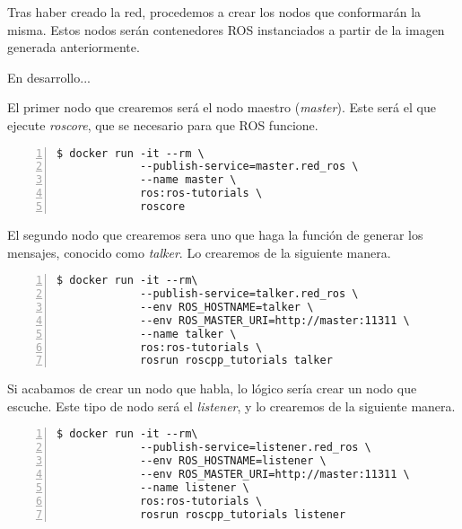 	Tras haber creado la red, procedemos a crear los nodos que conformarán la misma. Estos nodos serán contenedores ROS instanciados a partir de la imagen generada anteriormente.
	
	En desarrollo...
	
\iffalse
	


	El primer nodo que crearemos será el nodo maestro (\emph{master}). Este será el que ejecute \emph{roscore}, que se necesario para que ROS funcione.

	\begin{lstlisting}[style=consola,numbers=left]
$ docker run -it --rm \
             --publish-service=master.red_ros \
             --name master \
             ros:ros-tutorials \
             roscore
	\end{lstlisting}
	

	El segundo nodo que crearemos sera uno que haga la función de generar los mensajes, conocido como \emph{talker}. Lo crearemos de la siguiente manera.
		
	\begin{lstlisting}[style=consola,numbers=left]
$ docker run -it --rm\
             --publish-service=talker.red_ros \
             --env ROS_HOSTNAME=talker \
             --env ROS_MASTER_URI=http://master:11311 \
             --name talker \
             ros:ros-tutorials \
             rosrun roscpp_tutorials talker
	\end{lstlisting}
	

	Si acabamos de crear un nodo que habla, lo lógico sería crear un nodo que escuche. Este tipo de nodo será el \emph{listener}, y lo crearemos de la siguiente manera.

	\begin{lstlisting}[style=consola,numbers=left]
$ docker run -it --rm\
             --publish-service=listener.red_ros \
             --env ROS_HOSTNAME=listener \
             --env ROS_MASTER_URI=http://master:11311 \
             --name listener \
             ros:ros-tutorials \
             rosrun roscpp_tutorials listener
	\end{lstlisting}

